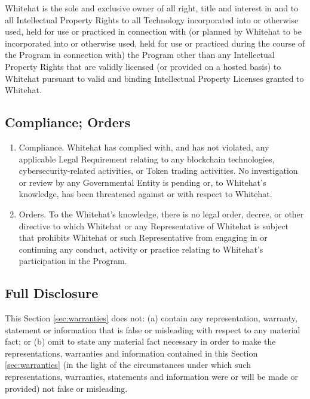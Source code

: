 \documentclass{article}
\begin{document}
Whitehat is the sole and exclusive owner of all right, title and interest in and to all Intellectual Property Rights to all Technology incorporated into or otherwise used, held for use or practiced in connection with (or planned by Whitehat to be incorporated into or otherwise used, held for use or practiced during the course of the Program in connection with) the Program other than any Intellectual Property Rights that are validly licensed (or provided on a hosted basis) to Whitehat pursuant to valid and binding Intellectual Property Licenses granted to Whitehat.

\subsection{Compliance; Orders}\label{subsec:compliance_orders}

\begin{enumerate}
    \item Compliance. Whitehat has complied with, and has not violated, any applicable Legal Requirement relating to any blockchain technologies, cybersecurity-related activities, or Token trading activities. No investigation or review by any Governmental Entity is pending or, to Whitehat's knowledge, has been threatened against or with respect to Whitehat.

    \item Orders. To the Whitehat's knowledge, there is no legal order, decree, or other directive to which Whitehat or any Representative of Whitehat is subject that prohibits Whitehat or such Representative from engaging in or continuing any conduct, activity or practice relating to Whitehat's participation in the Program.

\end{enumerate}

\subsection{Full Disclosure}\label{subsec:full_disclosure}

This Section \ref{sec:warranties} does not: (a) contain any representation, warranty, statement or information that is false or misleading with respect to any material fact; or (b) omit to state any material fact necessary in order to make the representations, warranties and information contained in this Section \ref{sec:warranties} (in the light of the circumstances under which such representations, warranties, statements and information were or will be made or provided) not false or misleading.
\end{document}

